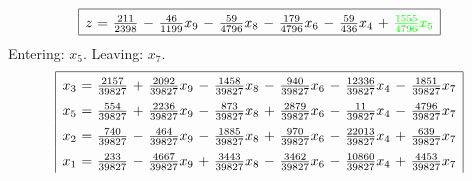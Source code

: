 \documentclass[11pt]{article}
\begin{document}
\begin{equation*}
\begin{array}{|rcrcrcrcrcrcr|}
\hline
z \mspace{-6mu}&\mspace{-6mu} = \mspace{-6mu}&\mspace{-6mu} \frac{211}{2398} \mspace{-6mu}&\mspace{-6mu} - \mspace{-6mu}&\mspace{-6mu} \frac{46}{1199} x_{9} \mspace{-6mu}&\mspace{-6mu} - \mspace{-6mu}&\mspace{-6mu} \frac{59}{4796} x_{8} \mspace{-6mu}&\mspace{-6mu} - \mspace{-6mu}&\mspace{-6mu} \frac{179}{4796} x_{6} \mspace{-6mu}&\mspace{-6mu} - \mspace{-6mu}&\mspace{-6mu} \frac{59}{436} x_{4} \mspace{-6mu}&\mspace{-6mu} + \mspace{-6mu}&\color{green}\mspace{-6mu} \frac{1555}{4796} x_{5}\\
\hline
\end{array}
\end{equation*}
Entering: $x_{5}$. Leaving: $x_{7}$. 
\begin{equation*}
\renewcommand{\arraystretch}{1.5} %
\begin{array}{|rcrcrcrcrcrcr|}
\hline
x_{3} \mspace{-6mu}&\mspace{-6mu} = \mspace{-6mu}&\mspace{-6mu} \frac{2157}{39827} \mspace{-6mu}&\mspace{-6mu} + \mspace{-6mu}&\mspace{-6mu} \frac{2092}{39827} x_{9} \mspace{-6mu}&\mspace{-6mu} - \mspace{-6mu}&\mspace{-6mu} \frac{1458}{39827} x_{8} \mspace{-6mu}&\mspace{-6mu} - \mspace{-6mu}&\mspace{-6mu} \frac{940}{39827} x_{6} \mspace{-6mu}&\mspace{-6mu} - \mspace{-6mu}&\mspace{-6mu} \frac{12336}{39827} x_{4} \mspace{-6mu}&\mspace{-6mu} - \mspace{-6mu}&\mspace{-6mu} \frac{1851}{39827} x_{7}\\
x_{5} \mspace{-6mu}&\mspace{-6mu} = \mspace{-6mu}&\mspace{-6mu} \frac{554}{39827} \mspace{-6mu}&\mspace{-6mu} + \mspace{-6mu}&\mspace{-6mu} \frac{2236}{39827} x_{9} \mspace{-6mu}&\mspace{-6mu} - \mspace{-6mu}&\mspace{-6mu} \frac{873}{39827} x_{8} \mspace{-6mu}&\mspace{-6mu} + \mspace{-6mu}&\mspace{-6mu} \frac{2879}{39827} x_{6} \mspace{-6mu}&\mspace{-6mu} - \mspace{-6mu}&\mspace{-6mu} \frac{11}{39827} x_{4} \mspace{-6mu}&\mspace{-6mu} - \mspace{-6mu}&\mspace{-6mu} \frac{4796}{39827} x_{7}\\
x_{2} \mspace{-6mu}&\mspace{-6mu} = \mspace{-6mu}&\mspace{-6mu} \frac{740}{39827} \mspace{-6mu}&\mspace{-6mu} - \mspace{-6mu}&\mspace{-6mu} \frac{464}{39827} x_{9} \mspace{-6mu}&\mspace{-6mu} - \mspace{-6mu}&\mspace{-6mu} \frac{1885}{39827} x_{8} \mspace{-6mu}&\mspace{-6mu} + \mspace{-6mu}&\mspace{-6mu} \frac{970}{39827} x_{6} \mspace{-6mu}&\mspace{-6mu} - \mspace{-6mu}&\mspace{-6mu} \frac{22013}{39827} x_{4} \mspace{-6mu}&\mspace{-6mu} + \mspace{-6mu}&\mspace{-6mu} \frac{639}{39827} x_{7}\\
x_{1} \mspace{-6mu}&\mspace{-6mu} = \mspace{-6mu}&\mspace{-6mu} \frac{233}{39827} \mspace{-6mu}&\mspace{-6mu} - \mspace{-6mu}&\mspace{-6mu} \frac{4667}{39827} x_{9} \mspace{-6mu}&\mspace{-6mu} + \mspace{-6mu}&\mspace{-6mu} \frac{3443}{39827} x_{8} \mspace{-6mu}&\mspace{-6mu} - \mspace{-6mu}&\mspace{-6mu} \frac{3462}{39827} x_{6} \mspace{-6mu}&\mspace{-6mu} - \mspace{-6mu}&\mspace{-6mu} \frac{10860}{39827} x_{4} \mspace{-6mu}&\mspace{-6mu} + \mspace{-6mu}&\mspace{-6mu} \frac{4453}{39827} x_{7}\\

\end{array}
\end{equation*}
\end{document}
